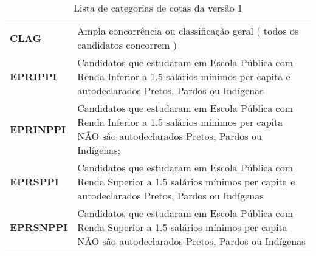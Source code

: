 \begin{table}
\caption{Lista de categorias de cotas da versão 1}
\label{tabela_categoriasv1}
\centering
\begin{tabular}{ l l }
   \cline{1-1}\cline{2-2}  
    \multicolumn{1}{|p{5.850cm}|}{\textbf{CLAG}} &
    \multicolumn{1}{p{8.217cm}|}{Ampla concorrência ou classificação geral 
( todos os candidatos concorrem )}
  \\ 
   \cline{1-1}\cline{2-2}  
    \multicolumn{1}{|p{5.850cm}|}{\textbf{EPRIPPI}} &
    \multicolumn{1}{p{8.217cm}|}{Candidatos que estudaram em Escola Pública com Renda Inferior a 1.5 salários mínimos per capita e autodeclarados Pretos, Pardos ou Indígenas}
  \\    
   \cline{1-1}\cline{2-2}  
    \multicolumn{1}{|p{5.850cm}|}{\textbf{EPRINPPI}} &
    \multicolumn{1}{p{8.217cm}|}{Candidatos que estudaram em Escola Pública com Renda Inferior a 1.5 salários mínimos per capita NÃO são autodeclarados Pretos, Pardos ou Indígenas; }
  \\    
   \cline{1-1}\cline{2-2}  
    \multicolumn{1}{|p{5.850cm}|}{\textbf{EPRSPPI}} &
    \multicolumn{1}{p{8.217cm}|}{Candidatos que estudaram em Escola Pública com Renda Superior a 1.5 salários mínimos per capita e autodeclarados Pretos, Pardos ou Indígenas}
  \\     
   \cline{1-1}\cline{2-2}  
    \multicolumn{1}{|p{5.850cm}|}{\textbf{EPRSNPPI}} &
    \multicolumn{1}{p{8.217cm}|}{Candidatos que estudaram em Escola Pública com Renda Superior a 1.5 salários mínimos per capita NÃO são autodeclarados Pretos, Pardos ou Indígenas}
  \\       
  \hline

 \end{tabular} 
\end{table}
